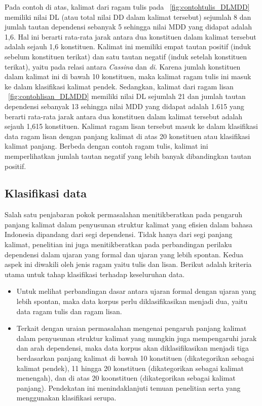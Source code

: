 Pada contoh di atas, kalimat dari ragam tulis pada \pic~\ref{fig:contohtulis_DLMDD} memiliki nilai DL (atau total nilai DD dalam kalimat tersebut) sejumlah 8 dan jumlah tautan dependensi sebanyak 5 sehingga nilai MDD yang didapat adalah 1,6. Hal ini berarti rata-rata jarak antara dua konstituen dalam kalimat tersebut adalah sejauh 1,6 konstituen. Kalimat ini memiliki empat tautan positif (induk sebelum konstituen terikat) dan satu tautan negatif (induk setelah konstituen terikat), yaitu pada relasi antara \textit{Cassina} dan \textit{di}. Karena jumlah konstituen dalam kalimat ini di bawah 10 konstituen, maka kalimat ragam tulis ini masuk ke dalam klasifikasi kalimat pendek. Sedangkan, kalimat dari ragam lisan \pic~\ref{fig:contohlisan_DLMDD} memiliki nilai DL sejumlah 21 dan jumlah tautan dependensi sebanyak 13 sehingga nilai MDD yang didapat adalah 1.615 yang berarti rata-rata jarak antara dua konstituen dalam kalimat tersebut adalah sejauh 1,615 konstituen. Kalimat ragam lisan tersebut masuk ke dalam klasifikasi data ragam lisan dengan panjang kalimat di atas 20 konstituen atau klasifikasi kalimat panjang. Berbeda dengan contoh ragam tulis, kalimat ini memperlihatkan jumlah tautan negatif yang lebih banyak dibandingkan tautan positif.

\subsection{Klasifikasi data}
Salah satu penjabaran pokok permasalahan menitikberatkan pada pengaruh panjang kalimat dalam penyusunan struktur kalimat yang efisien dalam bahasa Indonesia dipandang dari segi dependensi. Tidak hanya dari segi panjang kalimat, penelitian ini juga menitikberatkan pada perbandingan perilaku dependensi dalam ujaran yang formal dan ujaran yang lebih spontan. Kedua aspek ini diwakili oleh jenis ragam yaitu tulis dan lisan. Berikut adalah kriteria utama untuk tahap klasifikasi terhadap keseluruhan data.

\begin{itemize}
	\item Untuk melihat perbandingan dasar antara ujaran formal dengan ujaran yang lebih spontan, maka data korpus perlu diklasifikasikan menjadi dua, yaitu data ragam tulis dan ragam lisan.
	\item Terkait dengan uraian permasalahan mengenai pengaruh panjang kalimat dalam penyusunan struktur kalimat yang mungkin juga mempengaruhi jarak dan arah dependensi, maka data korpus akan diklasifikasikan menjadi tiga berdasarkan panjang kalimat di bawah 10 konstituen (dikategorikan sebagai kalimat pendek), 11 hingga 20 konstituen (dikategorikan sebagai kalimat menengah), dan di atas 20 koonstituen (dikategorikan sebagai kalimat panjang). Pendekatan ini menindaklanjuti temuan penelitian \cite{oya2011syntactic} serta \cite{jiang2015effects} yang menggunakan klasifikasi serupa. 
\end{itemize}

